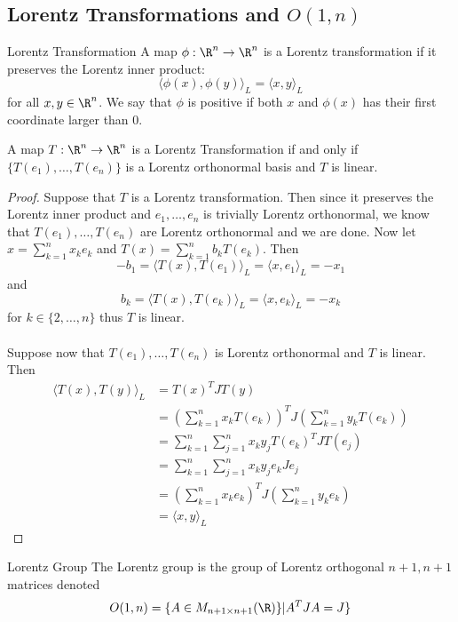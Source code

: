 \documentclass[a4paper]{article}
\begin{document}
\subsection{Lorentz Transformations and $O(1,n)$}
\begin{defn}{Lorentz Transformation}{} A map $\phi:\R^n\to\R^n$ is a Lorentz transformation if it preserves the Lorentz inner product: $$\langle\phi(x),\phi(y)\rangle_L=\langle x,y\rangle_L$$ for all $x,y\in\R^n$. We say that $\phi$ is positive if both $x$ and $\phi(x)$ has their first coordinate larger than $0$. 
\end{defn}

\begin{prp}{}{} A map $T:\R^n\to\R^n$ is a Lorentz Transformation if and only if $\{T(e_1),\dots,T(e_n)\}$ is a Lorentz orthonormal basis and $T$ is linear. \tcbline
\begin{proof}
Suppose that $T$ is a Lorentz transformation. Then since it preserves the Lorentz inner product and $e_1,\dots,e_n$ is trivially Lorentz orthonormal, we know that $T(e_1),\dots,T(e_n)$ are Lorentz orthonormal and we are done. Now let $x=\sum_{k=1}^nx_ke_k$ and $T(x)=\sum_{k=1}^nb_kT(e_k)$. Then $$-b_1=\langle T(x),T(e_1)\rangle_L=\langle x,e_1\rangle_L=-x_1$$ and $$b_k=\langle T(x),T(e_k)\rangle_L=\langle x,e_k\rangle_L=-x_k$$ for $k\in\{2,\dots,n\}$ thus $T$ is linear. \\~\\
Suppose now that $T(e_1),\dots,T(e_n)$ is Lorentz orthonormal and $T$ is linear. Then 
\begin{align*}
\langle T(x),T(y)\rangle_L&=T(x)^TJT(y)\\
&=\left(\sum_{k=1}^nx_kT(e_k)\right)^TJ\left(\sum_{k=1}^ny_kT(e_k)\right)\\
&=\sum_{k=1}^n\sum_{j=1}^nx_ky_jT(e_k)^TJT(e_j)\\
&=\sum_{k=1}^n\sum_{j=1}^nx_ky_je_kJe_j\\
&=\left(\sum_{k=1}^nx_ke_k\right)^TJ\left(\sum_{k=1}^ny_ke_k\right)\\
&=\langle x,y\rangle_L
\end{align*}
\end{proof}
\end{prp}

\begin{defn}{Lorentz Group}{} The Lorentz group is the group of Lorentz orthogonal $n+1,n+1$ matrices denoted $$O(1,n)=\{A\in M_{n+1\times n+1}(\R)\}|A^TJA=J\}$$
\end{defn}
\end{document}
